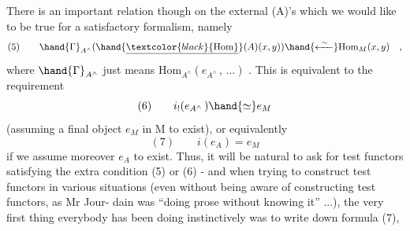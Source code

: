 There is an important relation though on the external \hand{\uline{\textcolor{black}{Hom}}}(A)'s
which we would like to be true for a satisfactory formalism,  namely
\[ (5) \qquad \hand{\Gamma}_{A^{\wedge}}(\hand{\underline{\textcolor{black}{\mathrm{Hom}}}}(A)(x,y)) \hand{\xleftarrow{\ \sim\ }} \mathrm{Hom}_{M}(x,y) \quad , \]
where $\hand{\Gamma}_{A^{\wedge}}$ just means  $\mathrm{Hom}_{A^{\wedge}}(e_{A^{\wedge}} \, , \, \ldots)$ .   This is equivalent  to
the requirement
\[ (6) \qquad i_{!}(e_{A^{\wedge}} \, ) \hand{\simeq} e_{M} \]
(assuming a final object $e_{M}$ \xout{\unsure{)}}in M to exist),  or equivalently
\[ (7) \qquad i(e_{A}) = e_{M} \]
if we assume moreover $e_{A}$ to exist.   Thus,  it will be natural to 
ask for test functors satisfying the extra condition (5) or (6)  -
and when trying to construct test functors in various situations
(even without being aware of constructing test functors,  as Mr Jour-%
dain was ``doing prose without knowing it'' ...),  the very first thing
everybody has been doing instinctively was to write down formula (7),

